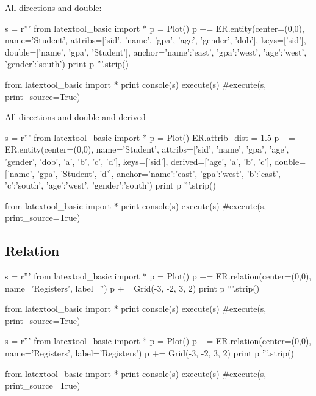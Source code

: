\newpage
All directions and double:
\begin{python}
s = r'''
from latextool_basic import *
p = Plot()
p += ER.entity(center=(0,0),
          name='Student',
          attribs=['sid', 'name', 'gpa', 'age', 'gender', 'dob'],
          keys=['sid'],
          double=['name', 'gpa', 'Student'],
          anchor={'name':'east', 'gpa':'west',
                  'age':'west', 'gender':'south'})
print p
'''.strip()

from latextool_basic import *
print console(s)
execute(s)
#execute(s, print_source=True)
\end{python}

\newpage
All directions and double and derived
\begin{python}
s = r'''
from latextool_basic import *
p = Plot()
ER.attrib_dist = 1.5
p += ER.entity(center=(0,0),
          name='Student',
          attribs=['sid', 'name', 'gpa', 'age', 'gender', 'dob', 'a', 'b', 'c', 'd'],
          keys=['sid'],
          derived=['age', 'a', 'b', 'c'],
          double=['name', 'gpa', 'Student', 'd'],
          anchor={'name':'east', 'gpa':'west', 'b':'east', 'c':'south',
                  'age':'west', 'gender':'south'})
print p
'''.strip()

from latextool_basic import *
print console(s)
execute(s)
#execute(s, print_source=True)
\end{python}



\newpage
\subsection{Relation}

\begin{python}
s = r'''
from latextool_basic import *
p = Plot()
p += ER.relation(center=(0,0), name='Registers', label='')
p += Grid(-3, -2, 3, 2)
print p
'''.strip()

from latextool_basic import *
print console(s)
execute(s)
#execute(s, print_source=True)
\end{python}

\begin{python}
s = r'''
from latextool_basic import *
p = Plot()
p += ER.relation(center=(0,0), name='Registers', label='Registers')
p += Grid(-3, -2, 3, 2)
print p
'''.strip()

from latextool_basic import *
print console(s)
execute(s)
#execute(s, print_source=True)
\end{python}

